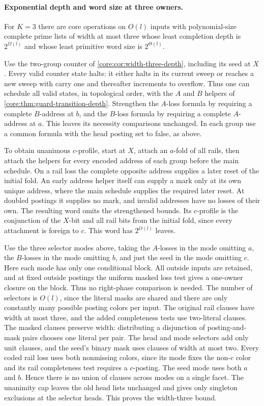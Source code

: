 \paragraph{Exponential depth and word size at three owners.}
\label{core:par:three-owner-exact-depth}
For $K=3$ there are core operations on $O(l)$ inputs
with polynomial-size complete prime lists of width at most three
whose least completion depth is $2^{\Omega(l)}$ and
whose least primitive word size is $2^{\Theta(l)}$.

Use the two-group counter of \cref{core:cor:width-three-depth},
including its seed at $X$. Every valid counter state halts:
it either halts in its current sweep or reaches a new
sweep with carry one and thereafter increments to overflow.
Thus one can schedule all valid states, in topological
order, with the $A$ and $B$ helpers of
\cref{core:thm:guard-transition-depth}.
Strengthen the $A$-loss formula by requiring a complete
$B$-address at $b$, and the $B$-loss formula by requiring
a complete $A$-address at $a$. This leaves its necessity
comparisons unchanged. In each group use a common formula
with the head posting set to false, as above.

To obtain unanimous $c$-profile, start at $X$, attach an
$a$-fold of all rails, then attach the helpers for every
encoded address of each group before the main schedule.
On a rail loss the complete opposite address supplies a
later reset of the initial fold. An early address helper
itself can supply a mark only at its own unique address,
where the main schedule supplies the required later reset.
At doubled postings it supplies no mark, and invalid
addresses have no losses of their own. The resulting word
omits the strengthened bounds. Its $c$-profile is the
conjunction of the $X$-bit and all rail bits from the
initial fold, since every attachment is foreign to $c$.
This word has $2^{O(l)}$ leaves.

Use the three selector modes above, taking the $A$-losses
in the mode omitting $a$, the $B$-losses in the mode
omitting $b$, and just the seed in the mode omitting $c$.
Here each mode has only one conditional block. All outside
inputs are retained, and at fixed outside postings the
uniform masked loss test gives a one-owner closure on the
block. Thus no right-phase comparison is needed. The
number of selectors is $O(l)$, since the literal masks
are shared and there are only constantly many possible
posting colors per input. The original rail clauses have width
at most three, and the added completeness tests use two-literal
clauses. The masked clauses preserve width: distributing a
disjunction of posting-and-mask pairs chooses one literal per
pair. The head and mode selectors add only unit clauses, and
the seed's binary mask uses clauses of width at most two.
Every coded rail loss uses both nonmissing colors, since its
mode fixes the non-$c$ color and its rail completeness test
requires a $c$-posting. The seed mode uses both $a$ and $b$.
Hence there is no union of clauses across modes on a single
facet. The unanimity cap leaves the old head lists unchanged
and gives only singleton exclusions at the selector heads.
This proves the width-three bound.

